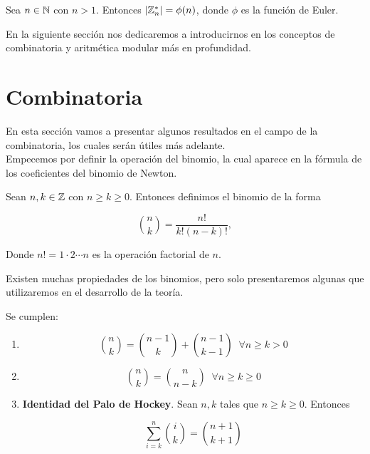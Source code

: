 \begin{proposicion}
	Sea $n \in \mathbb{N}$ con $n > 1$. Entonces $|\mathbb{Z}_n^*| = \phi(n)$, donde $\phi$ es la función de Euler.
\end{proposicion}

En la siguiente sección nos dedicaremos a introducirnos en los conceptos de combinatoria y aritmética modular más en profundidad.

\section{Combinatoria}

En esta sección vamos a presentar algunos resultados en el campo de la combinatoria, los cuales serán útiles más adelante.\\

Empecemos por definir la operación del binomio, la cual aparece en la fórmula de los coeficientes del binomio de Newton.

\begin{definicion}
	Sean $n, k \in \mathbb{Z}$ con $n \geq k \geq 0$. Entonces definimos el binomio de la forma
	
	\begin{equation}\label{formula_binomio}
	\binom{n}{k} = \frac{n!}{k!(n - k)!},
	\end{equation}
	
	Donde $n! = 1\cdot2\dotsm n$ es la operación factorial de $n$.
\end{definicion}

Existen muchas propiedades de los binomios, pero solo presentaremos algunas que utilizaremos en el desarrollo de la teoría.

\begin{proposicion}\label{propiedades_binomio}
	Se cumplen:
	
	\begin{enumerate}
		\item \[ \binom{n}{k} = \binom{n-1}{k} + \binom{n-1}{k-1}\;\;\forall n \geq k > 0 \]
		
		\item \[ \binom{n}{k} = \binom{n}{n-k}\;\;\forall n \geq k \geq 0 \]
		
		\item \textbf{Identidad del Palo de Hockey}. Sean $n, k$ tales que $n \geq k \geq 0$. Entonces
		
		\begin{equation}\label{identidad_del_palo_de_hockey}
		\sum_{i=k}^{n}\binom{i}{k} = \binom{n+1}{k+1}
		\end{equation}
	\end{enumerate}
\end{proposicion}

